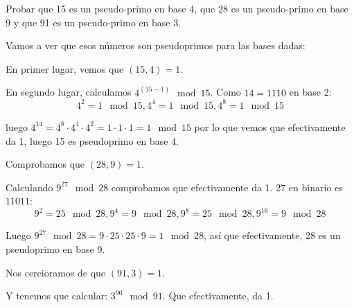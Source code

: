 \begin{problem}[8]
Probar que 15 es un pseudo-primo en base 4,
que 28 es un pseudo-primo en base 9 y que 91 es un pseudo-primo en
base 3.
\solution
{}

\spart
Vamos a ver que esos números son pseudoprimos para las bases dadas:

En primer lugar, vemos que $(15,4) = 1$.

En segundo lugar, calculamos $4^{(15-1)} \mod 15$. Como $14 = 1110$ en base 2:
\[
4^2 = 1 \mod 15, 4^4 = 1 \mod 15, 4^8 = 1 \mod 15
\]

luego $4^14 = 4^8 \cdot 4^4 \cdot 4^2 = 1 \cdot 1 \cdot 1 = 1 \mod 15 $ por lo que vemos que efectivamente da 1, luego 15 es pseudoprimo en base 4.

\spart

Comprobamos que $(28,9)=1$.

Calculando $9^{27} \mod 28$ comprobamos que efectivamente da 1.
$27$ en binario es $11011$:
\[ 9^2 = 25 \mod 28, 9^4 = 9 \mod 28, 9^8 = 25 \mod 28, 9^{16} = 9 \mod 28\]

Luego $9^{27} \mod 28 = 9 \cdot 25 \cdot 25 \cdot 9 = 1 \mod 28$, así que efectivamente, 28 es un pseudoprimo en base 9.

\spart

Nos cercioramos de que $(91,3) = 1$.

Y tenemos que calcular: $3^{90} \mod 91$. Que efectivamente, da 1. %

\end{problem}

